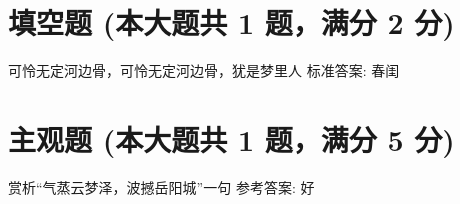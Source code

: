 \documentclass[12pt, a4paper, addpoints]{exam}
\begin{document}
\section{填空题 (本大题共 1 题，满分 2 分)}
\hspace{1.5cm}
\begin{questions}
\question[2] 可怜无定河边骨，可怜无定河边骨，犹是\uline{\qquad\qquad\qquad\qquad}梦里人
标准答案: 春闺

\end{questions}

\hspace{5cm}

\section{主观题 (本大题共 1 题，满分 5 分)}
\hspace{1.5cm}
\begin{questions}
\question[5] 赏析“气蒸云梦泽，波撼岳阳城”一句
参考答案: 好

\end{questions}
\end{document}
